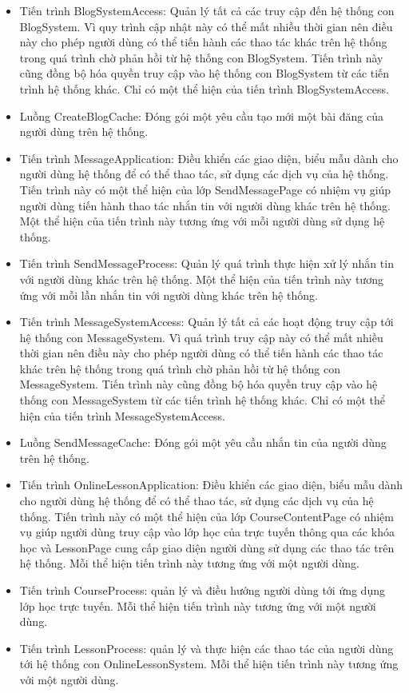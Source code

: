 \documentclass[./../main.tex]{subfiles}
\begin{document}
\begin{itemize}
	\item Tiến trình BlogSystemAccess: Quản lý tất cả các truy cập đến hệ thống con BlogSystem. Vì quy trình cập nhật này có thể mất nhiều thời gian nên điều này cho phép người dùng có thể tiến hành các thao tác khác trên hệ thống trong quá trình chờ phản hồi từ hệ thống con BlogSystem. Tiến trình này cũng đồng bộ hóa quyền truy cập vào hệ thống con BlogSystem từ các tiến trình hệ thống khác.
	      Chỉ có một thể hiện của tiến trình BlogSystemAccess.
	\item Luồng CreateBlogCache: Đóng gói một yêu cầu tạo mới một bài đăng của người dùng trên hệ thống.
	\item Tiến trình MessageApplication: Điều khiển các giao diện, biểu mẫu dành cho người dùng hệ thống để có thể thao tác, sử dụng các dịch vụ của hệ thống. Tiến trình này có một thể hiện của lớp SendMessagePage có nhiệm vụ giúp người dùng tiến hành thao tác nhắn tin với người dùng khác trên hệ thống.
	      Một thể hiện của tiến trình này tương ứng với mỗi người dùng sử dụng hệ thống.
	\item Tiến trình SendMessageProcess: Quản lý quá trình thực hiện xử lý nhắn tin với người dùng khác trên hệ thống.
	      Một thể hiện của tiến trình này tương ứng với mỗi lần nhắn tin với người dùng khác trên hệ thống.
	\item Tiến trình MessageSystemAccess: Quản lý tất cả các hoạt động truy cập tới hệ thống con MessageSystem. Vì quá trình truy cập này có thể mất nhiều thời gian nên điều này cho phép người dùng có thể tiến hành các thao tác khác trên hệ thống trong quá trình chờ phản hồi từ hệ thống con MessageSystem. Tiến trình này cũng đồng bộ hóa quyền truy cập vào hệ thống con MessageSystem từ các tiến trình hệ thống khác.
	      Chỉ có một thể hiện của tiến trình MessageSystemAccess.
	\item Luồng SendMessageCache: Đóng gói một yêu cầu nhắn tin của người dùng trên hệ thống.
	\item Tiến trình OnlineLessonApplication: Điều khiển các giao diện, biểu mẫu dành cho người dùng hệ thống để có thể thao tác, sử dụng các dịch vụ của hệ thống. Tiến trình này có một thể hiện của lớp CourseContentPage có nhiệm vụ giúp người dùng truy cập vào lớp học của trực tuyến thông qua các khóa học và LessonPage cung cấp giao diện người dùng sử dụng các thao tác trên hệ thống.
	      Mỗi thể hiện tiến trình này tương ứng với một người dùng.
	\item Tiến trình CourseProcess: quản lý và điều hướng người dùng tới ứng dụng lớp học trực tuyến.
	      Mỗi thể hiện tiến trình này tương ứng với một người dùng.
	\item Tiến trình LessonProcess: quản lý và thực hiện các thao tác của người dùng tới  hệ thống con OnlineLessonSystem.
	      Mỗi thể hiện tiến trình này tương ứng với một người dùng.


\end{itemize}
\end{document}
